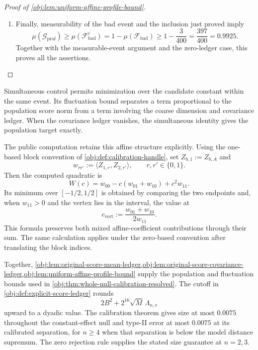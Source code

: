 \documentclass[11pt]{article}
\begin{document}
\begin{proof}[Proof of \cref{obj:lem:uniform-affine-profile-bound}]
\begin{enumerate}
\[\]
Here \(|c|^2\le1/4\). Since both ledger terms are nonnegative,
\[
\begin{aligned}
|W(c)-\|\theta_P(c)\|_2^2|
&\le
120\sqrt{\Lambda_{n,v}}\,\|\theta_P(c)\|_2
+
90\sqrt M\,\Lambda_{n,v}\\
&\le
128\left(
\sqrt{\Lambda_{n,v}}\,\|\theta_P(c)\|_2
+
\sqrt M\,\Lambda_{n,v}
\right).
\end{aligned}
\]
The sample was fixed throughout and \(c\) was arbitrary in the profiling interval. Thus
\[
\mathcal F_{\mathrm{bad}}^c\subseteq\mathcal G_{\mathrm{prof}}.
\]

\item
Finally, measurability of the bad event and the inclusion just proved imply
\[
\mu(\mathcal G_{\mathrm{prof}})
\ge
\mu(\mathcal F_{\mathrm{bad}}^c)
=
1-\mu(\mathcal F_{\mathrm{bad}})
\ge
1-\frac3{400}
=
\frac{397}{400}
=
0.9925.
\]
Together with the measurable-event argument and the zero-ledger case, this proves all the assertions.
\end{enumerate}
\end{proof}

Simultaneous control permits minimization over the candidate constant within the same event. Its fluctuation bound separates a term proportional to the population score norm from a term involving the coarse dimension and covariance ledger. When the covariance ledger vanishes, the simultaneous identity gives the population target exactly.

The public computation retains this affine structure explicitly. Using the one-based block convention of \cref{obj:def:calibration-handle}, set \(Z_{b,1}:=Z_{b,A}\) and
\[
w_{rr'}:=\langle Z_{1,r},Z_{2,r'}\rangle,
\qquad r,r'\in\{0,1\}.
\]
Then the computed quadratic is
\[
W(c)=w_{00}-c(w_{01}+w_{10})+c^2w_{11}.
\]
Its minimum over \([-1/2,1/2]\) is obtained by comparing the two endpoints and, when \(w_{11}>0\) and the vertex lies in the interval, the value at
\[
c_{\mathrm{vert}}:=\frac{w_{01}+w_{10}}{2w_{11}}.
\]
This formula preserves both mixed affine-coefficient contributions through their sum. The same calculation applies under the zero-based convention after translating the block indices.

Together, \cref{obj:lem:original-score-mean-ledger,obj:lem:original-score-covariance-ledger,obj:lem:uniform-affine-profile-bound} supply the population and fluctuation bounds used in \cref{obj:thm:whole-null-calibration-resolved}. The cutoff in \cref{obj:def:explicit-score-ledger} rounds
\[
2B^2+2^{16}\sqrt M\,\Lambda_{n,v}
\]
upward to a dyadic value. The calibration theorem gives size at most \(0.0075\) throughout the constant-effect null and type-II error at most \(0.0075\) at its calibrated separation, for \(n\ge4\) when that separation is below the model distance supremum. The zero rejection rule supplies the stated size guarantee at \(n=2,3\).
\end{document}
